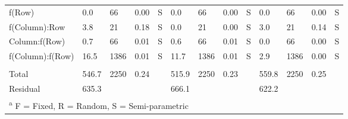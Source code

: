 \begin{landscape}
\begin{table}[H]
{\begin{tabular}[t]{lllllllllllll}
f(Row) & 0.0 & 66 & 0.00 & S & 0.0 & 66 & 0.00 & S & 0.0 & 66 & 0.00 & S\\
\addlinespace
f(Column):Row & 3.8 & 21 & 0.18 & S & 0.0 & 21 & 0.00 & S & 3.0 & 21 & 0.14 & S\\
Column:f(Row) & 0.7 & 66 & 0.01 & S & 0.6 & 66 & 0.01 & S & 0.0 & 66 & 0.00 & S\\
f(Column):f(Row) & 16.5 & 1386 & 0.01 & S & 11.7 & 1386 & 0.01 & S & 2.9 & 1386 & 0.00 & S\\
 &  &  &  &  &  &  &  &  &  &  &  & \\
Total & 546.7 & 2250 & 0.24 &  & 515.9 & 2250 & 0.23 &  & 559.8 & 2250 & 0.25 & \\
\addlinespace
Residual & 635.3 &  &  &  & 666.1 &  &  &  & 622.2 &  &  & \\
\bottomrule
\multicolumn{13}{l}{\rule{0pt}{1em}\textsuperscript{a} F = Fixed, R = Random, S = Semi-parametric}\\
\end{tabular}}
\end{table}

\end{landscape}
\restoregeometry


